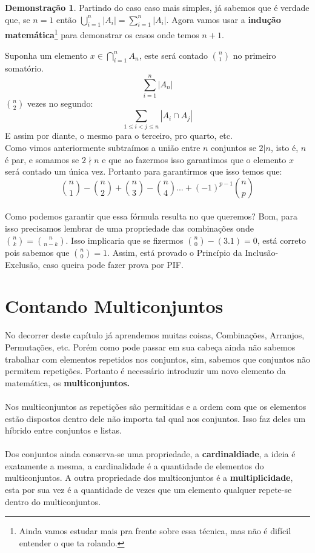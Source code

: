 \documentclass[a4paper,11pt,oneside]{book}
\theoremstyle{definition}
\theoremstyle{break}
\newtheorem{demonstration}{Demonstração}[section]
\begin{document}
\begin{demonstration}
Partindo do caso caso mais simples, já sabemos que é verdade que, se $n = 1$ então $\displaystyle \bigcup_{i = 1}^{n} |A_i| =  \sum_{i = 1}^{n} |A_i|$. Agora vamos usar a \textbf{indução matemática}\footnote{Ainda vamos estudar mais pra frente sobre essa técnica, mas não é difícil entender o que ta rolando.} para demonstrar os casos onde temos $n + 1$.
\end{demonstration}


Suponha um elemento $x \in \bigcap_{i=1}^{n} A_{n}$, este será contado $n \choose 1$ no primeiro somatório.
$$\sum\limits_{i=1}^n |A_{n}|$$
$n \choose 2$ vezes no segundo:
$$\sum\limits_{1 \leq i<j \leq n} |A_{i} \cap A_{j}|$$
E assim por diante, o mesmo para o terceiro, pro quarto, etc.
\\
Como vimos anteriormente subtraímos a união entre $n$ conjuntos se $2|n$, isto é, $n$ é par, e somamos se $2 \nmid n$ e que ao fazermos isso garantimos que o elemento $x$ será contado um única vez. Portanto para garantirmos que isso temos que:
\begin{equation}
{n \choose 1} - {n \choose 2} +{n \choose 3} -{n \choose 4} ... + (-1)^{p-1} 
{n \choose p}
\end{equation}
\\
Como podemos garantir que essa fórmula resulta no que queremos? Bom, para isso precisamos lembrar de uma propriedade das combinações onde ${n \choose k} = {n \choose n-k}$. Isso implicaria que se fizermos ${n \choose 0} - (3.1) = 0$, está correto pois sabemos que ${n \choose 0} = 1$. Assim, está provado o Princípio da Inclusão-Exclusão, caso queira pode fazer prova por PIF.

\section{Contando Multiconjuntos}
No decorrer deste capítulo já aprendemos muitas coisas, Combinações, Arranjos, Permutações, etc. Porém como pode passar em sua cabeça ainda não sabemos trabalhar com elementos repetidos nos conjuntos, sim, sabemos que conjuntos não permitem repetições. Portanto é necessário introduzir um novo elemento da matemática, os \textbf{multiconjuntos.}
\\
\\
Nos multiconjuntos as repetições são permitidas e a ordem com que os elementos estão dispostos dentro dele não importa tal qual nos conjuntos. Isso faz deles um híbrido entre conjuntos e listas.
\\
\\
Dos conjuntos ainda conserva-se uma propriedade, a \textbf{cardinaldiade}, a ideia é exatamente a mesma, a cardinalidade é a quantidade de elementos do multiconjuntos. A outra propriedade dos multiconjuntos é a \textbf{multiplicidade}, esta por sua vez é a quantidade de vezes que um elemento qualquer repete-se dentro do multiconjuntos.
\end{document}
